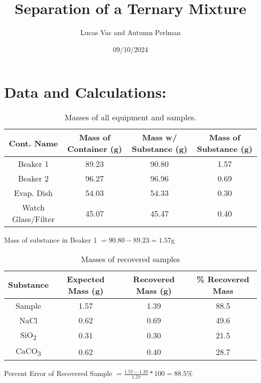 \documentclass{article}
\begin{document}
\author{Lucas Vas and Autumn Perlman}
\title{Separation of a Ternary Mixture}
\date{09/10/2024}

\maketitle

  \section*{Data and Calculations:}
  \begin{table}[h!]
    \centering
    \begin{tabular}{|| c c c c ||}
      \hline
      Cont. Name & Mass of Container (g) & Mass w/ Substance (g) & Mass of Substance (g) \\
      \hline\hline
      Beaker 1 & 89.23 & 90.80 & 1.57 \\
      \hline
      Beaker 2 & 96.27 & 96.96 & 0.69 \\
      \hline
      Evap. Dish & 54.03 & 54.33 & 0.30 \\
      \hline
      Watch Glass/Filter & 45.07 & 45.47 & 0.40 \\
      \hline
    \end{tabular}
    \label{table:1}
    \caption{Masses of all equipment and samples.}
  \end{table}
  \begin{center}
    Mass of substance in Beaker 1 $ = 90.80 - 89.23 = 1.57$g
  \end{center}

  \begin{table}[h!]
    \centering
    \begin{tabular}{|| c c c c ||}
      \hline
      Substance & Expected Mass (g) & Recovered Mass (g) & \% Recovered Mass \\
      \hline\hline
      Sample & 1.57 & 1.39 & 88.5 \\
      \hline
      NaCl & 0.62 & 0.69 & 49.6 \\
      \hline
      SiO\textsubscript{2} & 0.31 & 0.30 & 21.5 \\
      \hline
      CaCO\textsubscript{3} & 0.62 & 0.40 & 28.7 \\
      \hline
    \end{tabular}
    \label{table:2}
    \caption{Masses of recovered samples}
  \end{table}
  \begin{center}
    Percent Error of Recovered Sample $= \frac{1.57 - 1.39}{1.57} * 100 = 88.5\%$
  \end{center}
\end{document}
